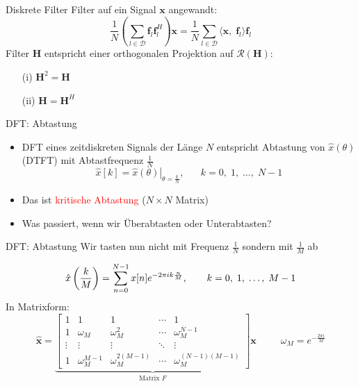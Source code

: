 \documentclass[14pt, aspectratio=169, handout]{beamer}
\begin{document}
\begin{frame}{Diskrete Filter}
    Filter auf ein Signal $\mathbf{x}$ angewandt:
$$\frac{1}{N} \left( \sum_{l \in \mathcal{D}} \mathbf{f}_l \mathbf{f}_l^H \right) \mathbf{x} = \frac{1}{N} \sum_{l \in \mathcal{D}} \langle \mathbf{x}, \; \mathbf{f}_l \rangle \mathbf{f}_l$$
Filter $\mathbf{H}$ entspricht einer orthogonalen Projektion auf $\mathcal{R}(\mathbf{H})$:

\begin{multicols}{2}
    \begin{itemize}
        \item[(i)] $\mathbf{H}^2 = \mathbf{H}$
        \item[(ii)] $\mathbf{H} = \mathbf{H}^H$
    \end{itemize}
\end{multicols}
\end{frame}

\begin{frame}{DFT: Abtastung}
    \begin{itemize}
        \item DFT eines zeitdiskreten Signals der Länge $N$ entspricht Abtastung von $\hat{x}(\theta)$ (DTFT) mit Abtastfrequenz $\frac{1}{N}$
         $$\hat{x}[k] = \left.\hat{x}(\theta)\right|_{\theta = \frac{k}{N}}, \hspace{20pt} k = 0, \; 1, \; \dots, \; N-1$$
        \item Das ist \textcolor{red}{kritische Abtastung} ($N \times N$ Matrix)
        \item[] 
        \item Was passiert, wenn wir Überabtasten oder Unterabtasten?
    \end{itemize}
\end{frame}

\begin{frame}{DFT: Abtastung}
    Wir tasten nun nicht mit Frequenz $\frac{1}{N}$ sondern mit $\frac{1}{M}$ ab

$$\hat{x}\left(\frac{k}{M}\right) = \sum_{n=0}^{N-1}x[n]e^{-2 \pi i k \frac{n}{M}}, \hspace*{20pt} k = 0, \; 1, \; \dots, \; M-1$$
In Matrixform:
$$\hat{\mathbf{x}} = \underbrace{\begin{bmatrix}
    1 & 1 & 1 & \cdots & 1 \\
    1 & \omega_M & \omega_M^2 & \cdots & \omega_M^{N-1} \\
    \vdots & \vdots & \vdots & \ddots & \vdots \\
    1 & \omega_M^{M-1} & \omega_M^{2(M-1)} & \cdots & \omega_M^{(N-1)(M-1)}
\end{bmatrix}}_{\text{Matrix }F} \mathbf{x} \hspace{30pt} \omega_M = e^{-\frac{2 \pi i}{M}}$$
\end{frame}
\end{document}
